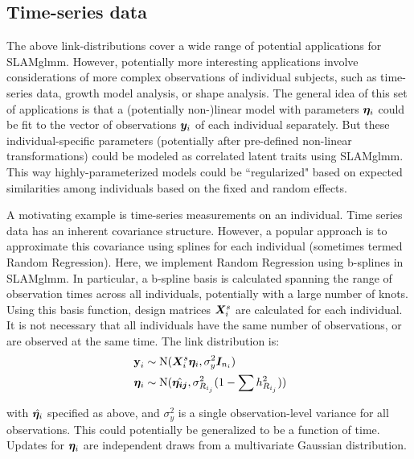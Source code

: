 \documentclass[11pt]{amsart}
\newcommand*{\B}[1]{\ifmmode\bm{#1}\else\textbf{#1}\fi}
\begin{document}
\subsection{Time-series data}
The above link-distributions cover a wide range of potential applications for SLAMglmm. However, potentially more interesting applications involve considerations of more complex observations of individual subjects, such as time-series data, growth model analysis, or shape analysis. The general idea of this set of applications is that a (potentially non-)linear model with parameters $\B{\eta}_i$ could be fit to the vector of observations $\B{y}_i$ of each individual separately. But these individual-specific parameters (potentially after pre-defined non-linear transformations) could be modeled as correlated latent traits using SLAMglmm. This way highly-parameterized models could be ``regularized" based on expected similarities among individuals based on the fixed and random effects.

A motivating example is time-series measurements on an individual. Time series data has an inherent covariance structure. However, a popular approach is to approximate this covariance using splines for each individual (sometimes termed Random Regression). Here, we implement Random Regression using b-splines in SLAMglmm. In particular, a b-spline basis is calculated spanning the range of observation times across all individuals, potentially with a large number of knots. Using this basis function,
design matrices $\B{X}^s_i$ are calculated for each individual. It is not necessary that all individuals have the same number of observations, or are observed at the same time. The link distribution is:
\begin{align} \begin{split}
\B{y}_i &\sim \mbox{N}(\B{X}^s_i \B{\eta}_i, \sigma^2_y \B{I}_{n_i}) \\
\;\B{\eta}_i &\sim \mbox{N}(\hat{\B{\eta_{ij}}},\sigma^2_{R_{i_j}}(1-\sum h^2_{R_{i_j}}))
\end{split}\end{align}

\noindent with $\hat{\B{\eta}_i}$ specified as above, and $\sigma^2_y$ is a single observation-level variance for all observations. This could potentially be generalized to be a function of time. Updates for $\B{\eta}_i$ are independent draws from a multivariate Gaussian distribution.
\end{document}
